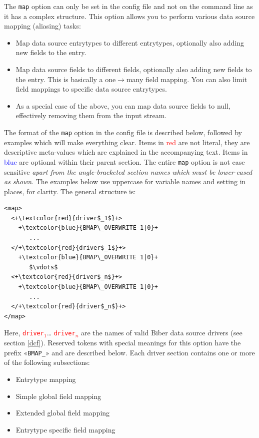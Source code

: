 \documentclass{ltxdockit}
\begin{document}
The \verb+map+ option can only be set in the config file
and not on the command line as it has a complex structure. This
option allows you to perform various data source mapping (aliasing)
tasks:

\begin{itemize}
\item Map data source entrytypes to different entrytypes,
  optionally also adding new fields to the entry.
\item Map data source fields to different fields,
  optionally also adding new fields to the entry. This is basically a
  one$\rightarrow$many field mapping. You can also limit field
  mappings to specific data source entrytypes.
\item As a special case of the above, you can map data source fields
  to null, effectively removing them from the input stream.
\end{itemize}

\noindent The format of the \verb+map+ option in the
config file is described below, followed by examples which will make
everything clear. Items in \textcolor{red}{red} are not
literal, they are descriptive meta-values which are explained in the
accompanying text. Items in \textcolor{blue}{blue} are optional within
their parent section. The entire \verb+map+ option is not case sensitive
\emph{apart from the angle-bracketed section names which must be
  lower-cased as shown}. The examples below use uppercase for variable names
and setting in places, for clarity. The general structure is:

\lstset{showspaces=false}
\begin{lstlisting}[escapechar=+,mathescape=true]
<map>
  <+\textcolor{red}{driver$_1$}+>
    +\textcolor{blue}{BMAP\_OVERWRITE 1|0}+
       ...
  </+\textcolor{red}{driver$_1$}+>
    +\textcolor{blue}{BMAP\_OVERWRITE 1|0}+
       $\vdots$
  <+\textcolor{red}{driver$_n$}+>
    +\textcolor{blue}{BMAP\_OVERWRITE 1|0}+
       ...
  </+\textcolor{red}{driver$_n$}+>
</map>
\end{lstlisting}

\noindent Here, \textcolor{red}{\texttt{driver$_1$}}\ldots
\textcolor{red}{\texttt{driver$_n$}} are the names of valid Biber data
source drivers (see section \ref{dcf}). Reserved tokens with special meanings for
this option have the prefix «\verb+BMAP_+» and are described below. Each
driver section contains one or more of the following subsections:

\begin{itemize}
\item Entrytype mapping
\item Simple global field mapping
\item Extended global field mapping
\item Entrytype specific field mapping
\end{itemize}
\end{document}
